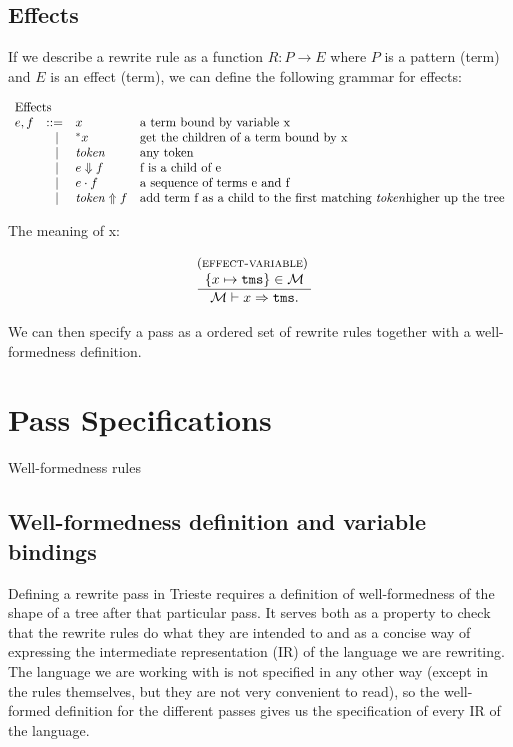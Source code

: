 \documentclass{article}
\newcommand{\rulename}{\textsc}
\newcommand{\irule}[3]{\begin{array}{l}{~\small\mbox{(\rulename{#1})}}\\\;\frac{\begin{array}{c}#2\end{array}}{\begin{array}{l}#3\end{array}}\end{array}}
\newcommand{\tok}{\ensuremath{\mathit{token}}} %
\newcommand{\tms}{\ensuremath{\mathtt{tms}}}
\newcommand{\bindings}{\ensuremath{\mathcal{M}}}
\newcommand{\pseq}[2]{\ensuremath{#1 \cdot #2}}
\newcommand{\children}[2]{\ensuremath{#1} \Downarrow #2}
\newcommand{\getchildren}[1]{\ensuremath{^*#1}}
\newcommand{\lift}[2]{\ensuremath{#1} \Uparrow #2}
\newcommand{\arrayheading}[2]{\multicolumn{#1}{l}{\mbox{#2}}}
\begin{document}
\subsection{Effects}

If we describe a rewrite rule as a function $R : P \to E$ where $P$ is a pattern (term) and $E$ is an effect (term), we can define the following grammar for effects:

\[
  \begin{array}{crll}
    \arrayheading{4}{Effects}\\
      e,f & ::= & x             & \text{a term bound by variable x}   \\
        & ~|~ & \getchildren{x} & \text{get the children of a term bound by x } \\
        & ~|~ & \tok            & \text{any token} \\
        & ~|~ & \children{e}{f} & \text{f is a child of e}  \\
        & ~|~ & \pseq{e}{f}     & \text{a sequence of terms e and f}   \\
        & ~|~ & \lift{\tok}{f}  & \text{add term f as a child to the first matching \tok higher up the tree} \\
  \end{array}
\]

The meaning of x:

\[
  \begin{array}{c}
    \irule{effect-variable}{
    \{x \mapsto \tms\} \in \bindings
    }{
    \bindings \vdash x \Rightarrow \tms.  
    }
    \quad
  \end{array}
\]

We can then specify a pass as a ordered set of rewrite rules together with a well-formedness definition.


\section{Pass Specifications}

Well-formedness rules

\subsection{Well-formedness definition and variable bindings}
Defining a rewrite pass in Trieste requires a definition of well-formedness of the shape of a tree after that particular pass. It serves both as a property to check that the rewrite rules do what they are intended to and as a concise way of expressing the intermediate representation (IR) of the language we are rewriting. The language we are working with is not specified in any other way (except in the rules themselves, but they are not very convenient to read), so the well-formed definition for the different passes gives us the specification of every IR of the language. 
\end{document}
